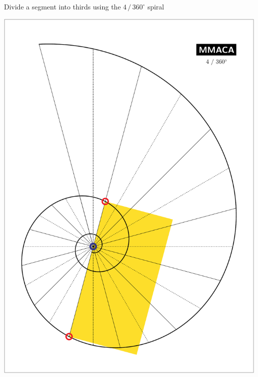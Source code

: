 \documentclass[a4paper,12pt]{article}
\begin{document}
    \newpage


    \begin{center}
    
        \large

        Divide a segment into thirds using the $4 \, / \, 360^{\circ}$ spiral

        \bigskip \bigskip \bigskip
    
        \includegraphics[scale=0.7071]{./pictures/Example_04}

    \end{center}

    \newpage

\end{document}
